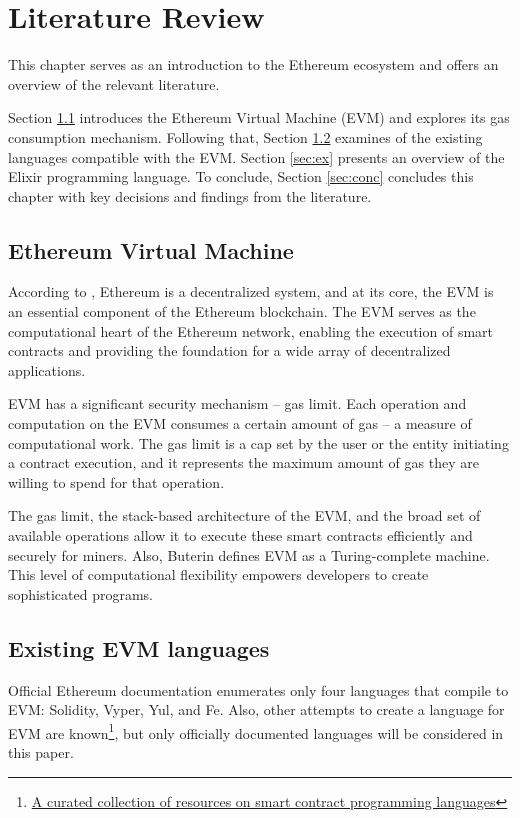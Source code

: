 \chapter{Literature Review}
\label{chap:lr}

This chapter serves as an introduction to the Ethereum ecosystem and offers an overview of the relevant literature.

Section \ref{sec:evm} introduces the Ethereum Virtual Machine (EVM) and explores its gas consumption mechanism. Following that, Section \ref{sec:langs} examines of the existing languages compatible with the EVM. Section \ref{sec:ex} presents an overview of the Elixir programming language. To conclude, Section \ref{sec:conc} concludes this chapter with key decisions and findings from the literature.

\section{Ethereum Virtual Machine}
\label{sec:evm}
According to \cite{EthereumWhitepaper}, Ethereum is a decentralized system, and at its core, the EVM is an essential component of the Ethereum blockchain. The EVM serves as the computational heart of the Ethereum network, enabling the execution of smart contracts and providing the foundation for a wide array of decentralized applications.

EVM has a significant security mechanism -- gas limit. Each operation and computation on the EVM consumes a certain amount of gas -- a measure of computational work. The gas limit is a cap set by the user or the entity initiating a contract execution, and it represents the maximum amount of gas they are willing to spend for that operation.

The gas limit, the stack-based architecture of the EVM, and the broad set of available operations allow it to  execute these smart contracts efficiently and securely for miners. Also, Buterin \cite{EthereumWhitepaper} defines EVM as a Turing-complete machine. This level of computational flexibility empowers developers to create sophisticated programs.

\section{Existing EVM languages}
\label{sec:langs}
Official Ethereum documentation \cite{OfficialEthereumLanguages} enumerates only four languages that compile to EVM: Solidity, Vyper, Yul, and Fe. Also, other attempts to create a language for EVM are known\footnote{\href{https://github.com/s-tikhomirov/smart-contract-languages}{A curated collection of resources on smart contract programming languages}}, but only officially documented languages will be considered in this paper.

